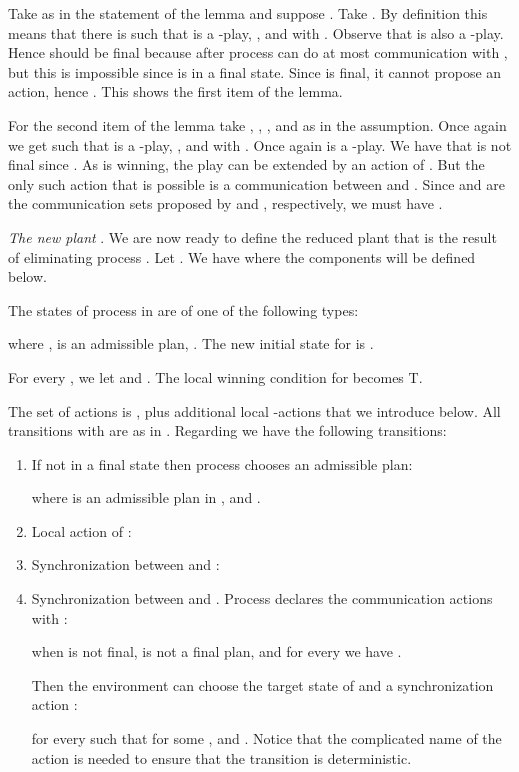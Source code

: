 \documentclass{llncs}
\renewenvironment{proof}{{\em Proof. }}{\nopagebreak
  \hspace*{\fill}}
\begin{document}
\begin{proof}
  Take  as in the statement of the lemma and suppose . Take . By definition this means
  that there is  such that  is a -play,
  , and  with . Observe that  is also a -play. Hence  should
  be final because after  process  can do at most
  communication with , but this is impossible since  is in a
  final state. Since  is final, it cannot propose an action,
  hence . This shows the first item of the lemma.

  For the second item of the lemma take , , , and  as in
  the assumption. Once again we get  such that
   is a -play, , and 
  with . Once again  is a -play. We have
  that  is not final since . As
   is winning, the play  can be extended by an action of
  . But the only such action that is possible is a communication
  between  and . Since  and  are the communication sets
  proposed by  and , respectively, we must
  have .
\end{proof}


\medskip
\textit{The new plant }.  We are now ready to define the reduced
plant  that is the result of eliminating process .  Let
.  We have  where the components will be
defined below.

The states of process  in  are of one of the following types:

where ,  is
an admissible plan, . The new initial state for  is
.


For every , we let  and . The local
winning condition for  becomes 
T.



The set of actions  is , plus
additional local -actions that we introduce below.
All transitions  with  are as in .
Regarding  we have the following transitions:
\begin{enumerate}
\item If not in a final state then process  chooses an admissible
  plan:
  
where  is an admissible plan in , and
  .

\item Local action of :

\item Synchronization between  and :

\item Synchronization between  and . Process  declares the
  communication actions with :
  
  when  is not final,   is not a final plan, and for every
   we have .




  Then the environment can choose the target state of  and a
  synchronization action :
  
  for every  such that  for some , and . Notice that the
complicated name of the action  is needed to ensure
that the transition is deterministic.

\end{enumerate}
\end{document}

